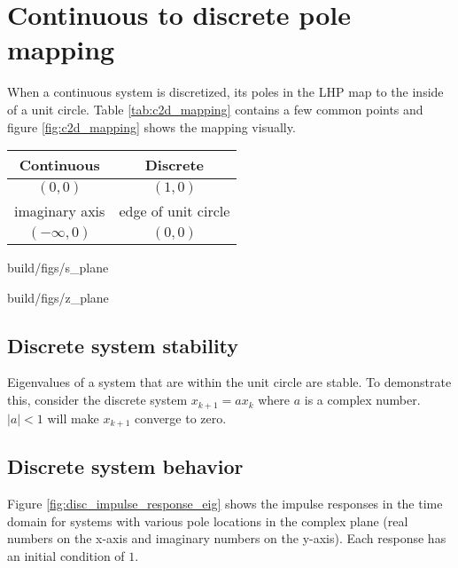 \section{Continuous to discrete pole mapping}

When a continuous system is discretized, its poles in the LHP map to the inside
of a unit circle. Table \ref{tab:c2d_mapping} contains a few common points and
figure \ref{fig:c2d_mapping} shows the mapping visually.
\begin{booktable}
  \begin{tabular}{|cc|}
    \hline
    \rowcolor{headingbg}
    \textbf{Continuous} & \textbf{Discrete} \\
    \hline
    $(0, 0)$ & $(1, 0)$ \\
    imaginary axis & edge of unit circle \\
    $(-\infty, 0)$ & $(0, 0)$ \\
    \hline
  \end{tabular}
  \caption{Mapping from continuous to discrete}
  \label{tab:c2d_mapping}
\end{booktable}
\begin{bookfigure}
  \begin{minisvg}{2}{build/figs/s_plane}
  \end{minisvg}
  \hfill
  \begin{minisvg}{2}{build/figs/z_plane}
  \end{minisvg}
  \caption{Mapping of complex plane from continuous (left) to discrete (right)}
  \label{fig:c2d_mapping}
\end{bookfigure}

\subsection{Discrete system stability}

Eigenvalues of a \gls{system} that are within the unit circle are stable. To
demonstrate this, consider the discrete system $x_{k + 1} = ax_k$ where $a$ is a
complex number. $|a| < 1$ will make $x_{k + 1}$ converge to zero.

\subsection{Discrete system behavior}

Figure \ref{fig:disc_impulse_response_eig} shows the \glspl{impulse response} in
the time domain for \glspl{system} with various pole locations in the complex
plane (real numbers on the x-axis and imaginary numbers on the y-axis). Each
response has an initial condition of $1$.
\begin{bookfigure}
  
  \caption{Discrete impulse response vs pole location}
  \label{fig:disc_impulse_response_eig}
\end{bookfigure}

